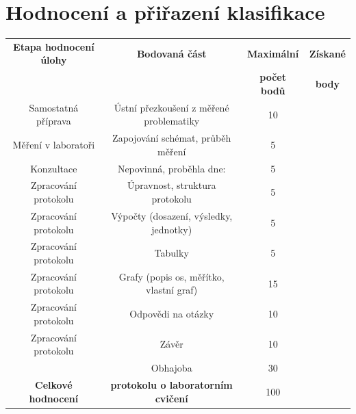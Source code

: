 \documentclass[a4paper,12pt]{report}
\begin{document}
\section*{Hodnocení a přiřazení klasifikace}
\begin{tabular}{|c|c|c|c|}
\hline
\textbf{Etapa hodnocení úlohy} & \textbf{Bodovaná část}                    & \textbf{Maximální}  & \textbf{Získané} \\
                               &                                           & \textbf{počet bodů} & \textbf{body}    \\\hline
Samostatná příprava            & Ústní přezkoušení z měřené problematiky   &  10                 &                  \\\hline
Měření v laboratoři            & Zapojování schémat, průběh měření         &   5                 &                  \\\hline
Konzultace                     & Nepovinná, proběhla dne:                  &   5                 &                  \\\hline
Zpracování protokolu           & Úpravnost, struktura protokolu            &   5                 &                  \\\hline
Zpracování protokolu           & Výpočty (dosazení, výsledky, jednotky)    &   5                 &                  \\\hline
Zpracování protokolu           & Tabulky                                   &   5                 &                  \\\hline
Zpracování protokolu           & Grafy (popis os, měřítko, vlastní graf)   &  15                 &                  \\\hline
Zpracování protokolu           & Odpovědi na otázky                        &  10                 &                  \\\hline
Zpracování protokolu           & Závěr                                     &  10                 &                  \\\hline
                               & Obhajoba                                  &  30                 &                  \\\hline
\textbf{Celkové hodnocení}     & \textbf{protokolu o laboratorním cvičení} & 100                 &                  \\\hline
\end{tabular}
\\
\\
\\
\end{document}
